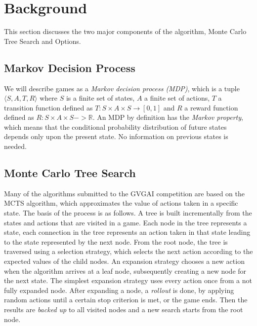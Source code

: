 \section{Background}
\label{sec:background}

This section discusses the two major components of the algorithm, Monte Carlo
Tree Search and Options. 

\subsection{Markov Decision Process}
We will describe games as a \emph{Markov decision process (MDP)}, which is a
tuple $\langle S, A, T, R \rangle$ where $S$ is a finite set of states, $A$ a
finite set of actions, $T$ a transition function defined as $T : S \times A
\times S \rightarrow \left[0,1\right]$ and $R$ a reward function defined as $R:
S \times A \times S -> \mathbb{R}$. An MDP by definition has the \emph{Markov
property}, which means that the conditional probability distribution of future
states depends only upon the present state. No information on previous states
is needed.

\subsection{Monte Carlo Tree Search}
Many of the algorithms submitted to the GVGAI competition are based on the MCTS
algorithm\cn, which approximates the value of actions taken in a specific state.
The basis of the process is as follows. A tree is built incrementally from the
states and actions that are visited in a game.  Each node in the tree represents
a state, each connection in the tree represents an action taken in that state
leading to the state represented by the next node.  From the root node, the tree
is traversed using a selection strategy, which selects the next action according
to the expected values of the child nodes. An expansion strategy chooses a new
action when the algorithm arrives at a leaf node, subsequently creating a new
node for the next state. The simplest expansion strategy uses every action once
from a not fully expanded node. After expanding a node, a \emph{rollout} is
done, by applying random actions until a certain stop criterion is met, or the
game ends. Then the results are \emph{backed up} to all visited nodes and a new
search starts from the root node.

